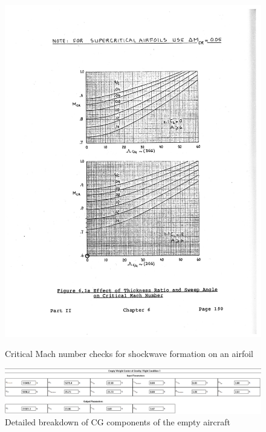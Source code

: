 \documentclass[conf]{new-aiaa}
\begin{document}
\begin{figure}
    \includegraphics[width=\textwidth]{plots/Mcr_check.png}
    \label{fig:critical_mach_check}
    \caption{Critical Mach number checks for shockwave formation on an airfoil}
\end{figure}

\begin{figure}
    \includegraphics[width=\textwidth]{Report3Printouts/Cg/Cg_Empty_Detailed_Empty_cropped.png}
    \caption{Detailed breakdown of CG components of the empty aircraft}
    \label{fig:cg_detailed_empty}
\end{figure}
\end{document}
